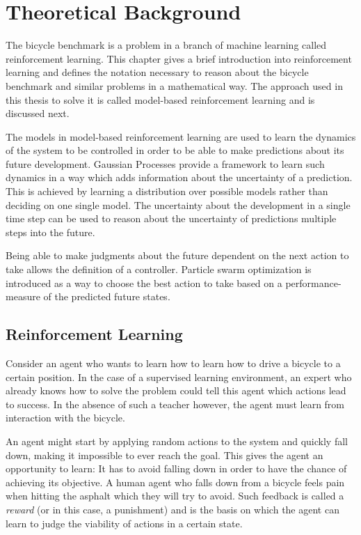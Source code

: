 \chapter{Theoretical Background}
The bicycle benchmark is a problem in a branch of machine learning called reinforcement learning.
This chapter gives a brief introduction into reinforcement learning and defines the notation necessary to reason about the bicycle benchmark and similar problems in a mathematical way.
The approach used in this thesis to solve it is called model-based reinforcement learning and is discussed next.

The models in model-based reinforcement learning are used to learn the dynamics of the system to be controlled in order to be able to make predictions about its future development.
Gaussian Processes provide a framework to learn such dynamics in a way which adds information about the uncertainty of a prediction.
This is achieved by learning a distribution over possible models rather than deciding on one single model.
The uncertainty about the development in a single time step can be used to reason about the uncertainty of predictions multiple steps into the future.

Being able to make judgments about the future dependent on the next action to take allows the definition of a controller.
Particle swarm optimization is introduced as a way to choose the best action to take based on a performance-measure of the predicted future states.

\section{Reinforcement Learning}
Consider an agent who wants to learn how to learn how to drive a bicycle to a certain position.
In the case of a supervised learning environment, an expert who already knows how to solve the problem could tell this agent which actions lead to success.
In the absence of such a teacher however, the agent must learn from interaction with the bicycle.

An agent might start by applying random actions to the system and quickly fall down, making it impossible to ever reach the goal.
This gives the agent an opportunity to learn:
It has to avoid falling down in order to have the chance of achieving its objective.
A human agent who falls down from a bicycle feels pain when hitting the asphalt which they will try to avoid.
Such feedback is called a \emph{reward} (or in this case, a punishment) and is the basis on which the agent can learn to judge the viability of actions in a certain state.

